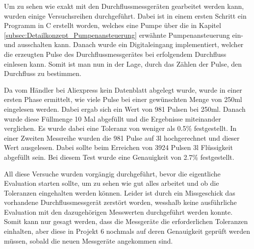 Um zu sehen wie exakt mit den Durchflussmessgeräten gearbeitet werden kann, wurden einige Versuchsreihen durchgeführt. Dabei ist in einem ersten Schritt ein Programm in C erstellt worden, welches eine Pumpe über die in Kapitel \ref{subsec:Detailkonzept_Pumpenansteuerung} erwähnte Pumpenansteuerung ein- und ausschalten kann. Danach wurde ein Digitaleingang implementiert, welcher die erzeugten Pulse des Durchflussmessgerätes bei erfolgendem Durchfluss einlesen kann. Somit ist man nun in der Lage, durch das Zählen der Pulse, den Durchfluss zu bestimmen. 

Da vom Händler bei Aliexpress kein Datenblatt abgelegt wurde, wurde in einer ersten Phase ermittelt, wie viele Pulse bei einer gewünschten Menge von 250ml eingelesen werden. Dabei ergab sich ein Wert von 981 Pulsen bei 250ml. Danach wurde diese Füllmenge 10 Mal abgefüllt und die Ergebnisse miteinander verglichen. Es wurde dabei eine Toleranz von weniger als 0.5\% festgestellt. In einer Zweiten Messreihe wurden die 981 Pulse auf 3l hochgerechnet und dieser Wert ausgelesen. Dabei sollte beim Erreichen von 3924 Pulsen 3l Flüssigkeit abgefüllt sein. Bei diesem Test wurde eine Genauigkeit von 2.7\% festgestellt. 

All diese Versuche wurden vorgängig durchgeführt, bevor die eigentliche Evaluation starten sollte, um zu sehen wie gut alles arbeitet und ob die Toleranzen eingehalten werden können. Leider ist durch ein Missgeschick das vorhandene Durchflussmessgerät zerstört worden, wesshalb keine ausführliche Evaluation mit den dazugehörigen Messwerten durchgeführt werden konnte. Somit kann nur gesagt werden, dass die Messgeräte die erforderlichen Toleranzen einhalten, aber diese in Projekt 6 nochmals auf deren Genauigkeit geprüft werden müssen, sobald die neuen Messgeräte angekommen sind.